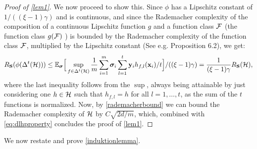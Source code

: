 \begin{proof}[Proof of \cref{lem1}]
  We now proceed to show this. Since $\phi$ has a Lipschitz constant of $1/((\xi-1)\gamma)$ and is continuous, and since the Rademacher complexity of the composition of a continuous Lipschitz function $ g $  and a function class $\mathcal{F}$ (the function class $ g(\mathcal{F}) $ ) is bounded by the Rademacher complexity of the function class $ \mathcal{F} $,  multiplied by the Lipschitz constant (See e.g. \cite{rademacherboundlecturenotes} Proposition 6.2), we get:
  \begin{align*}R_{\mathbf{S}}(\phi(\Delta^{t}(\mathcal{H})))\leq \mathbb{E}_{\bm{\sigma}}\Big[\sup_{f \in \Delta^{t}(\mathcal{H})} \frac{1}{m} \sum_{i=1}^{m} \bm{\sigma}_i  \sum_{l=1}^{t}\mathbf{y}_{i}h_{f,l}(\mathbf{x}_i)/t\Big]/((\xi-1)\gamma)=\frac{1}{(\xi-1)\gamma }R_{\mathbf{S}}(\mathcal{H}) ,\end{align*}
  where the last inequality follows from the $ \sup $, always being attainable by just considering one $ h\in \mathcal{H} $ such that $ h_{f,l}=h $ for all $ l=1,\ldots,t $, as the sum of the $ t $ functions is normalized. Now, by \cref{rademacherbound} we can bound the Rademacher complexity of $\mathcal{H}$ by $C\sqrt{2d/m}$, which, combined with \cref{eq:dlhproperty} concludes the proof of \cref{lem1}.
  
  \end{proof}
  
We now restate and prove \cref{induktionlemma}.

\induktionlemma*
  
